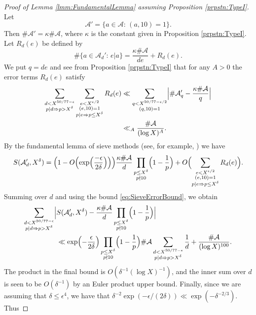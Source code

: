 \documentclass[10pt]{amsart}
\theoremstyle{plain}
\numberwithin{sblmm}{thrm}
\numberwithin{equation}{section}
\begin{document}
\begin{proof}[Proof of Lemma \ref{lmm:FundamentalLemma} assuming Proposition \ref{prpstn:TypeI}]
Let
\[
\mathcal{A}'=\{a\in\mathcal{A}{}:\,(a,10)=1\}.
\]
Then $\#\mathcal{A}'=\kappa\#\mathcal{A}{}$, where $\kappa$ is the constant given in Proposition \ref{prpstn:TypeI}. Let $R_d(e)$ be defined by
\[
\#\{a\in\mathcal{A}_{d}':\, e|a\}=\frac{\kappa\#\mathcal{A}{}}{d e}+R_d(e).
\]
We put $q=d e$ and see from Proposition \ref{prpstn:TypeI} that for any $A>0$ the error terms $R_{d}(e)$ satisfy
%
\begin{align}
\sum_{\substack{d<X^{50/77-\epsilon}\\ p|d\Rightarrow p>X^{\delta}}}\sum_{\substack{e<X^{\epsilon/2}\\ (e,10)=1\\ p|e\Rightarrow p\le X^{\delta}}}R_d(e)
&\ll\sum_{\substack{q<X^{50/77-\epsilon/2}\\ (q,10)=1}}\Bigl|\#\mathcal{A}'_{q}-\frac{\kappa\#\mathcal{A}{}}{q}\Bigr|\nonumber\\
&\ll_A \frac{\#\mathcal{A}}{(\log{X})^A}.
\label{eq:SieveErrorBound}
\end{align}
%
By the fundamental lemma of sieve methods (see, for example, \cite[Theorem 6.9]{FriedlanderIwaniec}) we have
\[
S(\mathcal{A}'_d,X^\delta)=\Bigl(1-O\Bigl(\exp\Bigl(\frac{-\epsilon}{2\delta}\Bigr)\Bigr)\Bigr)\frac{\kappa\#\mathcal{A}{}}{d}\prod_{\substack{p\le X^\delta \\ p\nmid 10}}\Bigl(1-\frac{1}{p}\Bigr)+O\Bigl( \sum_{\substack{e<X^{\epsilon/2}\\ (e,10)=1 \\ p|e\Rightarrow p\le X^\delta}}R_d(e)\Bigr).
\]
Summing over $d$ and using the bound \eqref{eq:SieveErrorBound}, we obtain 
%
\begin{align*}
\sum_{\substack{d<X^{50/77-\epsilon}\\ p|d\Rightarrow p>X^{\delta}}}\Bigl|&S(\mathcal{A}'_{d},X^{\delta})-\frac{\kappa\#\mathcal{A}{}}{d}\prod_{\substack{p\le X^{\delta}\\ p\nmid 10}}\Bigl(1-\frac{1}{p}\Bigr)\Bigr|\\
&\ll \exp\Bigl(-\frac{\epsilon}{2\delta}\Bigr)\prod_{\substack{p\le X^{\delta}\\ p\nmid 10}}\Bigl(1-\frac{1}{p}\Bigr)\#\mathcal{A}{}\sum_{\substack{d<X^{50/77-\epsilon}\\ p|d\Rightarrow p>X^{\delta}}}\frac{1}{d}+\frac{\#\mathcal{A}}{(\log{X})^{100}}.
\end{align*}
%
The product in the final bound is $O(\delta^{-1}(\log{X})^{-1})$, and the inner sum over $d$ is seen to be $O(\delta^{-1})$ by an Euler product upper bound. Finally, since we are assuming that $\delta\le \epsilon^4$, we have that $\delta^{-2}\exp(-\epsilon/(2\delta))\ll \exp(-\delta^{-2/3})$. Thus

\end{proof}
\end{document}
